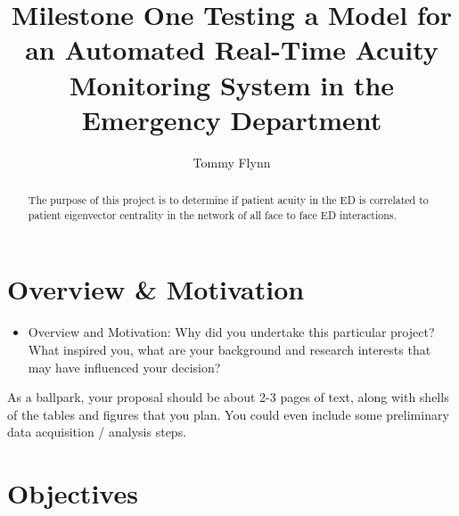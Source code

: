 \documentclass[]{elsarticle} %
\providecommand{\tightlist}{%
  \setlength{\itemsep}{0pt}\setlength{\parskip}{0pt}}
\begin{document}
\begin{frontmatter}

  \title{Milestone One Testing a Model for an Automated Real-Time Acuity
Monitoring System in the Emergency Department}
    \author[Emory University]{Tommy Flynn}
      \address[Emory University]{Emory University Nell Hodgson School of Nursing, 1520 Clifton Road NE,
Atlanta, GA, 30322}
  
  \begin{abstract}
  The purpose of this project is to determine if patient acuity in the ED
  is correlated to patient eigenvector centrality in the network of all
  face to face ED interactions.
  \end{abstract}
  
 \end{frontmatter}

\section{Overview \& Motivation}\label{overview-motivation}

\begin{itemize}
\tightlist
\item
  Overview and Motivation: Why did you undertake this particular
  project? What inspired you, what are your background and research
  interests that may have influenced your decision?
\end{itemize}

As a ballpark, your proposal should be about 2-3 pages of text, along
with shells of the tables and figures that you plan. You could even
include some preliminary data acquisition / analysis steps.

\section{Objectives}\label{objectives}
\end{document}

